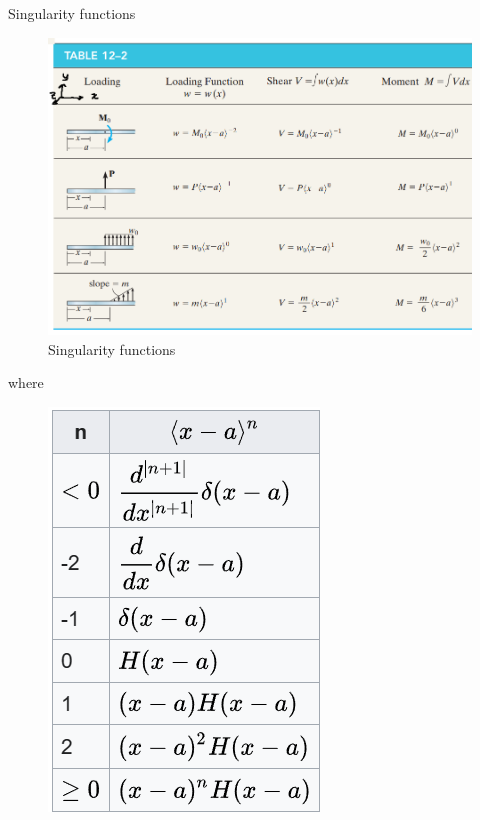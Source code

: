 Singularity functions
\begin{figure}[H]
    \centering
    \includegraphics[width=1\linewidth]{Figures/sec5 singularity.png}
    \caption{Singularity functions}
    \label{fig:sec5 singularity functions}
\end{figure}
where 
\begin{figure}[H]
    \centering
    \includegraphics[width=0.5\linewidth]{Figures/sec10 singularity.png}
\end{figure}
